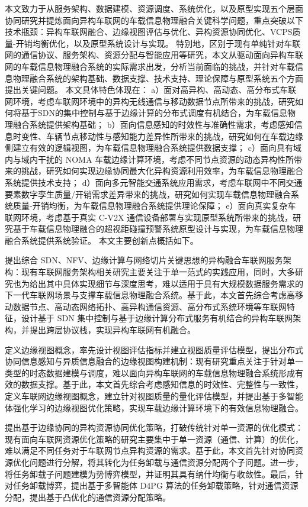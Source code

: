 本文致力于从服务架构、数据建模、资源调度、系统优化，以及原型实现五个层面协同研究并提炼面向异构车联网的车载信息物理融合关键科学问题，重点突破以下技术瓶颈：异构车联网融合、边缘视图评估与优化、异构资源协同优化、VCPS质量-开销均衡优化，以及原型系统设计与实现。
特别地，区别于现有单纯针对车联网的通信协议、服务架构、资源分配与智能应用等研究，本文从驱动面向异构车联网的车载信息物理融合系统的实际需求出发，分析当前面临的挑战，并针对车载信息物理融合系统的架构基础、数据支撑、技术支持、理论保障与原型系统五个方面提出关键问题。
本文具体特色体现在：
a）面对高异构、高动态、高分布式车联网环境，考虑车联网环境中的异构无线通信与移动数据节点所带来的挑战，研究如何将基于SDN的集中控制与基于边缘计算的分布式调度有机结合，为车载信息物理融合系统提供架构基础；
b）面向信息感知的时效性与准确性需求，考虑感知信息时变性、车辆节点移动性与感知能力差异性所带来的挑战，研究如何在车载边缘侧建立有效的逻辑视图，为车载信息物理融合系统提供数据支撑；
c）面向具有域内与域内干扰的 NOMA 车载边缘计算环境，考虑不同节点资源的动态异构性所带来的挑战，研究如何实现边缘协同最大化异构资源利用效率，为车载信息物理融合系统提供技术支持；
d）面向多元智能交通系统应用需求，考虑车联网中不同交通要素数字孪生质量/开销需求差异带来的挑战，研究如何实现车载信息物理融合系统质量-开销均衡，为车载信息物理融合系统提供理论保障；
e）面向真实复杂车联网环境，考虑基于真实 C-V2X 通信设备部署与实现原型系统所带来的挑战，研究基于车载信息物理融合的超视距碰撞预警系统原型设计与实现，为车载信息物理融合系统提供系统验证。
本文主要创新点概括如下。

 提出综合 SDN、NFV、边缘计算与网络切片关键思想的异构融合车联网服务架构：现有车联网服务架构相关研究主要关注于单一范式的实践应用，同时，大多研究也为给出其中具体实现细节与深度思考，难以适用于具有大规模数据服务需求的下一代车联网场景与支撑车载信息物理融合系统。基于此，本文首先综合考虑高移动数据节点、高动态网络拓扑、高异构通信资源、高分布式系统环境等车联网特征，设计基于 SDN 集中控制与基于边缘计算分布式服务有机结合的异构车联网架构，并提出跨层协议栈，实现异构车联网有机融合。

 定义边缘视图概念，率先设计视图评估指标并建立视图质量评估模型，提出分布式协同信息感知与异质信息融合的边缘视图构建机制：现有研究重点关注于针对单一类型的时态数据建模与调度，难以面向异构车联网的车载信息物理融合系统形成有效的数据支撑。基于此，本文首先综合考虑感知信息的时效性、完整性与一致性，定义车联网边缘视图概念，建立针对视图质量的量化评估模型，并提出基于多智能体强化学习的边缘视图优化策略，实现车载边缘计算环境下的有效信息物理融合。

 提出基于边缘协同的异构资源协同优化策略，打破传统针对单一资源的优化模式：现有面向车联网资源优化策略的研究主要集中于单一资源（通信、计算）的优化，难以满足不同任务对于车联网节点异构资源的需求。基于此，本文首先针对协同资源优化问题进行分解，将其转化为任务卸载与通信资源分配两个子问题。进一步，将任务卸载子问题建模为势博弈模型，并证明其具有纳什均衡与收敛性。最后，针对任务卸载博弈，提出基于多智能体 D4PG 算法的任务卸载策略，针对通信资源分配，提出基于凸优化的通信资源分配策略。

